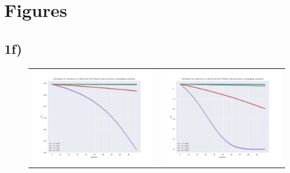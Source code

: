 \section{Figures}
\subsection{1f)}\label{app:fig}

\begin{figure}
\hspace{-2.8cm}
\begin{tabular}{cc}
\includegraphics[width = 0.5\paperwidth]{figures/gibbs_1p_1d_N2.pdf} & \includegraphics[width = 0.5\paperwidth]{figures/gibbs_1p_2d_N3.pdf} \\

\end{tabular}
\end{figure}
